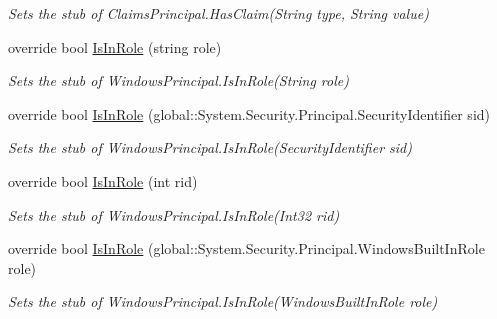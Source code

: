 \begin{DoxyCompactItemize}
\begin{DoxyCompactList}\small\item\em Sets the stub of Claims\-Principal.\-Has\-Claim(\-String type, String value)\end{DoxyCompactList}\item 
override bool \hyperlink{class_system_1_1_security_1_1_principal_1_1_fakes_1_1_stub_windows_principal_a1773aac1ccc41add1d732562036f6c5a}{Is\-In\-Role} (string role)
\begin{DoxyCompactList}\small\item\em Sets the stub of Windows\-Principal.\-Is\-In\-Role(\-String role)\end{DoxyCompactList}\item 
override bool \hyperlink{class_system_1_1_security_1_1_principal_1_1_fakes_1_1_stub_windows_principal_a2c0d0aceb33455b1728ef53685567b10}{Is\-In\-Role} (global\-::\-System.\-Security.\-Principal.\-Security\-Identifier sid)
\begin{DoxyCompactList}\small\item\em Sets the stub of Windows\-Principal.\-Is\-In\-Role(\-Security\-Identifier sid)\end{DoxyCompactList}\item 
override bool \hyperlink{class_system_1_1_security_1_1_principal_1_1_fakes_1_1_stub_windows_principal_a69de56bf6f7e0a499dfb387bf32b1758}{Is\-In\-Role} (int rid)
\begin{DoxyCompactList}\small\item\em Sets the stub of Windows\-Principal.\-Is\-In\-Role(\-Int32 rid)\end{DoxyCompactList}\item 
override bool \hyperlink{class_system_1_1_security_1_1_principal_1_1_fakes_1_1_stub_windows_principal_a19fe06e4fa3b1ee9ad715f8ef4214eeb}{Is\-In\-Role} (global\-::\-System.\-Security.\-Principal.\-Windows\-Built\-In\-Role role)
\begin{DoxyCompactList}\small\item\em Sets the stub of Windows\-Principal.\-Is\-In\-Role(\-Windows\-Built\-In\-Role role)\end{DoxyCompactList}\end{DoxyCompactItemize}
